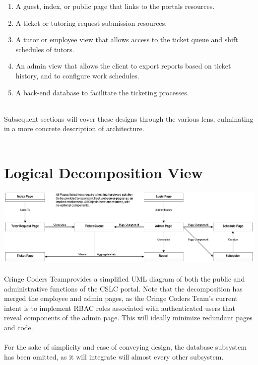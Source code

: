 \documentclass[oneside,openany,obeyspaces]{book}
\newcommand\tab[1][1cm]{\hspace*{#1}}
\newcommand\TeamName{Cringe Coders Team}
\begin{document}
\begin{flushleft}
    \begin{enumerate}
        \item A guest, index, or public page that links to the portals resources.
        \item A ticket or tutoring request submission resources.
        \item A tutor or employee view that allows access to the ticket queue and shift schedules of tutors.
        \item An admin view that allows the client to export reports based on ticket history, and to configure work schedules.
        \item A back-end database to facilitate the ticketing processes.\\~\\
    \end{enumerate}

    \tab Subsequent sections will cover these designs through the various lens, culminating in a more concrete description of architecture.\\~\\


    \section{Logical Decomposition View}

    \includegraphics[width=160mm,scale=0.5]{img/UML Object Model.png}\\~\\

    \tab \TeamName provides a simplified UML diagram of both the public and administrative functions of the CSLC portal. Note that the decomposition has merged the  employee and admin pages, as the \TeamName's current intent is to implement RBAC roles associated with authenticated users that reveal components of the admin page. This will ideally minimize redundant pages and code.\\~\\

    \tab For the sake of simplicity and ease of conveying design, the database subsystem has been omitted, as it will integrate will almost every other subsystem.


\end{flushleft}
\end{document}
